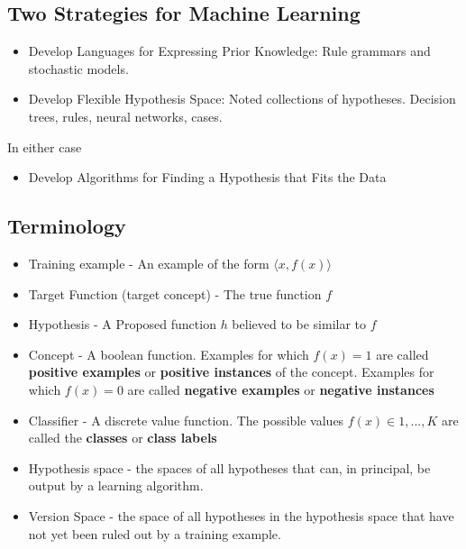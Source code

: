 \subsection{Two Strategies for Machine Learning}
\begin{itemize}
  \item Develop Languages for Expressing Prior Knowledge: Rule grammars and stochastic models.
  \item Develop Flexible Hypothesis Space: Noted collections of hypotheses. Decision trees, rules, neural networks, cases.
\end{itemize}
In either case
\begin{itemize}
  \item Develop Algorithms for Finding a Hypothesis that Fits the Data
\end{itemize}

\subsection{Terminology}
\begin{itemize}
  \item Training example - An example of the form $\langle x, f(x)\rangle$
  \item Target Function (target concept) - The true function $f$
  \item Hypothesis - A Proposed function $h$ believed to be similar to $f$
  \item Concept - A boolean function. Examples for which $f(x)=1$ are called \textbf{positive examples} or \textbf{positive instances} of the concept. Examples for which $f(x)=0$ are called \textbf{negative examples} or \textbf{negative instances}
  \item Classifier - A discrete value function. The possible values $f(x)\in{1,...,K}$ are called the \textbf{classes} or \textbf{class labels}
  \item Hypothesis space - the spaces of all hypotheses that can, in principal, be output by a learning algorithm.
  \item Version Space - the space of all hypotheses in the hypothesis space that have not yet been ruled out by a training example.
\end{itemize}

